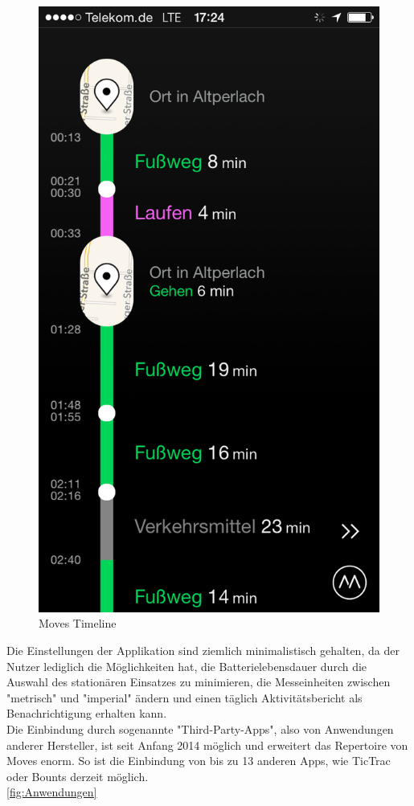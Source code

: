 \begin{figure}[h]
\centering
\includegraphics[scale=0.3]{images/moves_app_screenshot.png}
\caption{Moves Timeline \cite{fig:Timeline}}
\label{fig:Timeline}
\end{figure}

Die Einstellungen der Applikation sind ziemlich minimalistisch gehalten, da der Nutzer lediglich die Möglichkeiten hat, die Batterielebensdauer durch die Auswahl des stationären Einsatzes zu minimieren, die Messeinheiten zwischen "metrisch" und "imperial" ändern und einen täglich Aktivitätsbericht als Benachrichtigung erhalten kann. 
\\
Die Einbindung durch sogenannte "Third-Party-Apps", also von Anwendungen anderer Hersteller, ist seit Anfang 2014 möglich und erweitert das Repertoire von Moves enorm. 
So ist die Einbindung von bis zu 13 anderen Apps, wie TicTrac oder Bounts derzeit möglich.  
\\
\ref{fig:Anwendungen}

